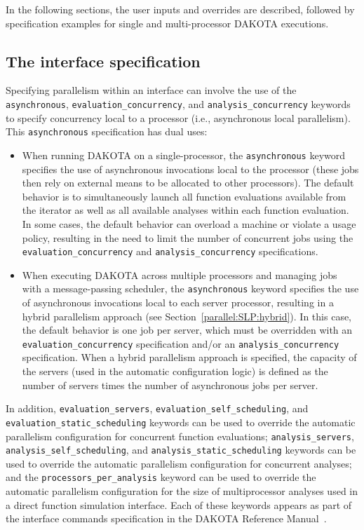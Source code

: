 In the following sections, the user inputs and overrides are
described, followed by specification examples for single and
multi-processor DAKOTA executions.

\subsection{The interface specification}\label{parallel:spec:interface}

Specifying parallelism within an interface can involve the use of the
\texttt{asynchronous}, \texttt{evaluation\_concurrency}, and
\texttt{analysis\_concurrency} keywords to specify concurrency local
to a processor (i.e., asynchronous local parallelism). This
\texttt{asynchronous} specification has dual uses:

\begin{itemize}
\item When running DAKOTA on a single-processor, the
  \texttt{asynchronous} keyword specifies the use of asynchronous
  invocations local to the processor (these jobs then rely on external
  means to be allocated to other processors). The default behavior is
  to simultaneously launch all function evaluations available from the
  iterator as well as all available analyses within each function
  evaluation. In some cases, the default behavior can overload a
  machine or violate a usage policy, resulting in the need to limit
  the number of concurrent jobs using the
  \texttt{evaluation\_concurrency} and \texttt{analysis\_concurrency}
  specifications.

\item When executing DAKOTA across multiple processors and managing
  jobs with a message-passing scheduler, the \texttt{asynchronous}
  keyword specifies the use of asynchronous invocations local to each
  server processor, resulting in a hybrid parallelism approach (see
  Section~\ref{parallel:SLP:hybrid}). In this case, the default
  behavior is one job per server, which must be overridden with an
  \texttt{evaluation\_concurrency} specification and/or an
  \texttt{analysis\_concurrency} specification. When a hybrid
  parallelism approach is specified, the capacity of the servers (used
  in the automatic configuration logic) is defined as the number of
  servers times the number of asynchronous jobs per server.
\end{itemize}

In addition, \texttt{evaluation\_servers},
\texttt{evaluation\_self\_scheduling}, and
\texttt{evaluation\_static\_scheduling} keywords can be used to
override the automatic parallelism configuration for concurrent
function evaluations; \texttt{analysis\_servers},
\texttt{analysis\_self\_scheduling}, and
\texttt{analysis\_static\_scheduling} keywords can be used to override
the automatic parallelism configuration for concurrent analyses; and
the \texttt{processors\_per\_analysis} keyword can be used to override
the automatic parallelism configuration for the size of multiprocessor
analyses used in a direct function simulation interface. Each of these
keywords appears as part of the interface commands specification in
the DAKOTA Reference Manual~\cite{RefMan}.

